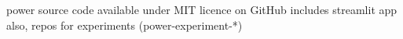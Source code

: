 power source code available under MIT licence on GitHub
includes streamlit app
also, repos for experiments (power-experiment-*)

